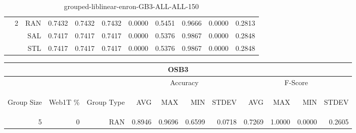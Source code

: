 \begin{center}
\begin{table}[htbp]
\begin{center}
\begin{tabular}{ | r | r | r | r | r | r | r | r | r | r | r |}
 & \multirow{3}{*}{2} & RAN & 0.7432 & 0.7432 & 0.7432 & 0.0000 & 0.5451 & 0.9666 & 0.0000 & 0.2813\\ \cline{3-11}
 &   & SAL & 0.7417 & 0.7417 & 0.7417 & 0.0000 & 0.5376 & 0.9867 & 0.0000 & 0.2848\\ \cline{3-11}
 &   & STL & 0.7417 & 0.7417 & 0.7417 & 0.0000 & 0.5376 & 0.9867 & 0.0000 & 0.2848\\ \cline{2-11}
\hline
\end{tabular}
\caption{grouped-liblinear-enron-GB3-ALL-ALL-150}
\end{center}
 \end{table}
\end{center}

\begin{center}
\begin{table}[htbp] 
 \begin{center}
\begin{tabular}{ | r | r | r | r | r | r | r | r | r | r | r |}
\hline
\multicolumn{11}{|c|}{OSB3}\\
\hline
 & & & \multicolumn{4}{|c|}{Accuracy} & \multicolumn{4}{|c|}{F-Score}\\ \cline{4-11}
\begin{sideways}Group Size\end{sideways} & \begin{sideways}Web1T \%\end{sideways} & \begin{sideways}Group Type\end{sideways} & \begin{sideways}AVG\end{sideways} & \begin{sideways}MAX\end{sideways} & \begin{sideways}MIN\end{sideways} & \begin{sideways}STDEV\end{sideways} & \begin{sideways}AVG\end{sideways} & \begin{sideways}MAX\end{sideways} & \begin{sideways}MIN\end{sideways} & \begin{sideways}STDEV\end{sideways}\\
\hline
\multirow{18}{*}{5}
 & \multirow{3}{*}{0} & RAN & 0.8946 & 0.9696 & 0.6599 & 0.0718 & 0.7269 & 1.0000 & 0.0000 & 0.2605\\ \cline{3-11}

\end{tabular}
\end{center}
\end{table}
\end{center}
